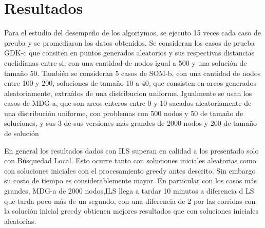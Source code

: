 \documentclass{ci5652}
\begin{document}
\section{Resultados}
Para el estudio del desempeño de los algoriymos, se ejecuto 15 veces cada caso de preuba y se promediaron
los datos obtenidos. Se consideran los casos de prueba GDK-c que consiten en puntos generados aleatorios y
sus respectivas distancias euclidianas entre si, con una cantidad de nodos igual a 500 y una solución de tamaño 50.
También se consideran 5 casos de SOM-b, con una cantidad de nodos entre 100 y 200, soluciones de tamaño 10 a 40, que consisten
en arcos generados aleatoriamente, extraídos de una distribucion uniforme. Igualmente se usan los casos de MDG-a, que
son arcos enteros entre 0 y 10 sacados aleatoriamente de una distribución uniforme, con problemas con 500 nodos y 50 de tamaño de soluciones, y sus 3 de sus versiones más grandes de 2000 nodos y 200 de tamaño de solución

En general los resultados dados con ILS superan en calidad a los presentado solo con Búsquedad Local.
Esto ocurre tanto con soluciones iniciales aleatorias como con soluciones iniciales con el procesamiento
greedy antes descrito. Sin embargo su costo de tiempo es considerablemente mayor. En particular con los casos
más grandes, MDG-a de 2000 nodos,ILS llega a tardar 10 minutos a diferencia d LS que tarda poco más de un segundo,
con una diferencia de 2%
por las corridas con la solución inicial greedy obtienen mejores resultados que con soluciones iniciales
aleatorias.




\small

\end{document}
